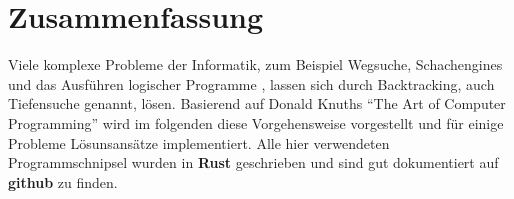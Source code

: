 \chapter*{Zusammenfassung}

Viele komplexe Probleme der Informatik, zum Beispiel Wegsuche, Schachengines und 
das Ausführen logischer Programme \cite[p. ~19]{DBLP:journals/jlp/SomogyiHC96}, lassen sich durch Backtracking, auch Tiefensuche genannt, lösen.
Basierend auf Donald Knuths "`The Art of Computer Programming"'\cite{TAOCP} wird im folgenden diese Vorgehensweise 
vorgestellt und für einige Probleme Lösunsansätze implementiert. Alle hier verwendeten Programmschnipsel wurden in \textbf{Rust} geschrieben und sind
gut dokumentiert auf \textbf{github}\cite{Kauschke} zu finden.
